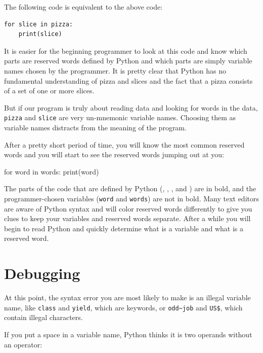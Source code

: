 The following code is equivalent to the above code:

\begin{Verbatim}[frame=single]
for slice in pizza:
    print(slice)
\end{Verbatim}

It is easier for the beginning programmer to look at this code and know which parts are reserved words defined by Python and which parts are simply variable names chosen by the programmer. It is pretty clear that Python has no fundamental understanding of pizza and slices and the fact that a pizza consists of a set of one or more slices.

But if our program is truly about reading data and looking for words in the data, \texttt{pizza} and \texttt{slice} are very un-mnemonic variable names. Choosing them as variable names distracts from the meaning of the program.

After a pretty short period of time, you will know the most common reserved words and you will start to see the reserved words jumping out at you:

\begin{python}[frame=single]
for word in words:
    print(word)
\end{python}


The parts of the code that are defined by Python
(,
, 
, 
and \pythoninline{:}) are in bold, and the programmer-chosen variables (\texttt{word} and
\texttt{words}) are not in bold. Many text editors are aware of Python syntax and will color reserved words differently to give you clues to keep your variables and reserved words separate. After a while you will begin to read Python and quickly determine what is a variable and what is a reserved word.

\hypertarget{depuraciuxf3n}{%
\section{Debugging}\label{depuraciuxf3n}}


At this point, the syntax error you are most likely to make is an illegal variable name, like \texttt{class} and
\texttt{yield},  which are keywords, or \texttt{odd\textasciitilde{}job} and \texttt{US\$}, which contain illegal characters.

 

If you put a space in a variable name, Python thinks it is two operands without an operator:

